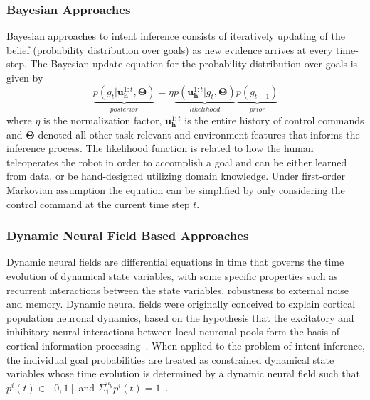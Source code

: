 \documentclass[conference]{IEEEtran}
\begin{document}
\subsubsection{Bayesian Approaches}
Bayesian approaches to intent inference consists of iteratively updating of the belief (probability distribution over goals) as new evidence arrives at every time-step. The Bayesian update equation for the probability distribution over goals is given by
\begin{equation*}
\underbrace{p(g_t| \boldsymbol{u}^{1:t}_{\boldsymbol{h}}, \boldsymbol{\Theta})}_{posterior} = \eta \underbrace{p(\boldsymbol{u}^{1:t}_{\boldsymbol{h}} | g_t, \boldsymbol{\Theta})}_{likelihood}\underbrace{p(g_{t-1})}_{prior}
\end{equation*}
where $\eta$ is the normalization factor, $\boldsymbol{u}^{1:t}_{\boldsymbol{h}}$ is the entire history of control commands and $\boldsymbol{\Theta}$ denoted all other task-relevant and environment features that informs the inference process. The likelihood function is related to how the human teleoperates the robot in order to accomplish a goal and can be either learned from data, or be hand-designed utilizing domain knowledge. Under first-order Markovian assumption the equation can be simplified by only considering the control command at the current time step $t$. 
\subsubsection{Dynamic Neural Field Based Approaches}
Dynamic neural fields are differential equations in time that governs the time evolution of dynamical state variables, with some specific properties such as recurrent interactions between the state variables, robustness to external noise and memory. Dynamic neural fields were originally conceived to explain cortical population neuronal dynamics, based on the hypothesis that the excitatory and inhibitory neural interactions between local neuronal pools form the basis of cortical information processing~\citep{schoner2008dynamical}. 
When applied to the problem of intent inference, the individual goal probabilities are treated as constrained dynamical state variables whose time evolution is determined by a dynamic neural field such that $p^i(t) \in [0, 1]$ and $\Sigma_{1}^{n_g}p^{i}(t) = 1$~\citep{gopinath2017disamb}. 
\end{document}
